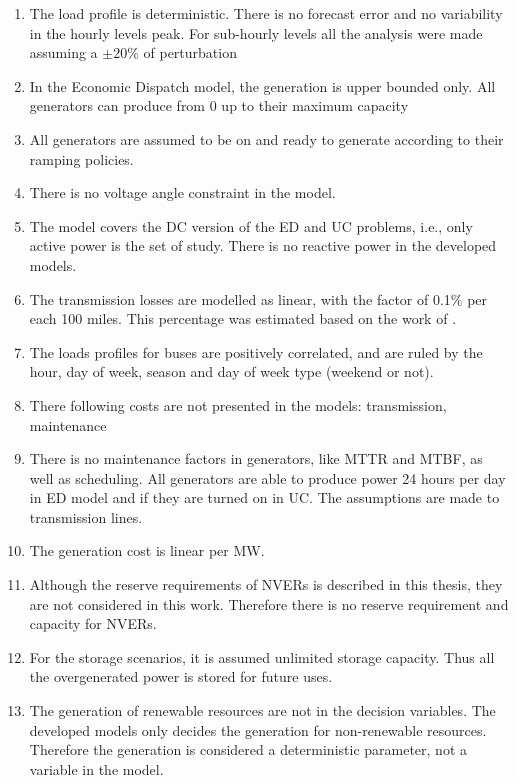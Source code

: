 \documentclass[12pt,LUDisStyle,twosided]{book}
\begin{document}
\begin{enumerate}
\item The load profile is deterministic. There is no forecast error and no variability in the hourly levels peak. For sub-hourly levels all the analysis were made assuming a $\pm20\%$ of perturbation
\item In the Economic Dispatch model, the generation is upper bounded only. All generators can produce from 0 up to their maximum capacity
\item All generators are assumed to be on and ready to generate according to their ramping policies.
\item There is no voltage angle constraint in the model.
\item The model covers the DC version of the ED and UC problems, i.e., only active power is the set of study. There is no reactive power in the developed models.
\item The transmission losses are modelled as linear, with the factor of 0.1\% per each 100 miles. This percentage was estimated based on the work of \citeauthor{short} \cite{short}.
\item The loads profiles for buses are positively correlated, and are ruled by the hour, day of week, season and day of week type (weekend or not).
\item There following costs are not presented in the models: transmission, maintenance
\item There is no maintenance factors in generators, like MTTR and MTBF, as well as scheduling. All generators are able to produce power 24 hours per day in ED model and if they are turned on in UC. The assumptions are made to transmission lines.
\item The generation cost is linear per MW.
\item Although the reserve requirements of NVERs is described in this thesis, they are not considered in this work. Therefore there is no reserve requirement and capacity for NVERs.
\item For the storage scenarios, it is assumed unlimited storage capacity. Thus all the overgenerated power is stored for future uses.
\item The generation of renewable resources are not in the decision variables. The developed models only decides the generation for non-renewable resources. Therefore the generation is considered a deterministic parameter, not a variable in the model.

\end{enumerate}
\end{document}

